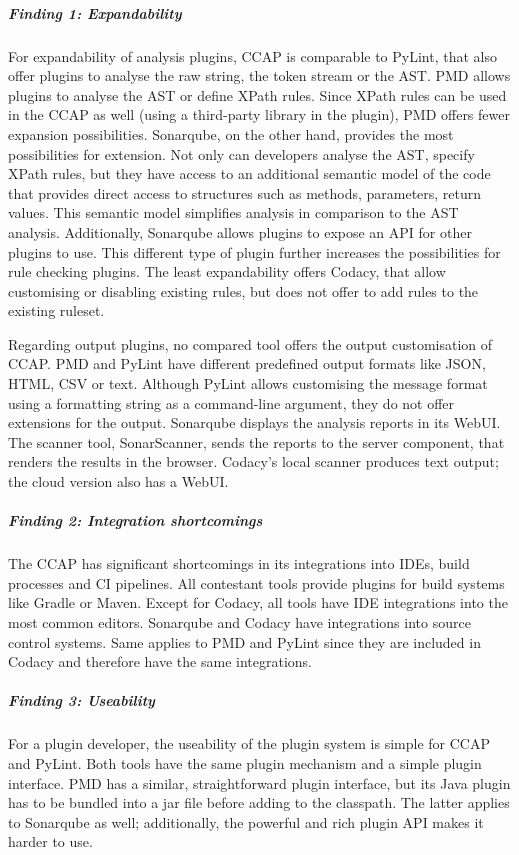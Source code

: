 \subparagraph{Finding 1: Expandability}
For expandability of analysis plugins, CCAP is comparable to PyLint, that also offer plugins to analyse the raw string, the token stream or the AST. PMD allows plugins to analyse the AST or define XPath rules. Since XPath rules can be used in the CCAP as well (using a third-party library in the plugin), PMD offers fewer expansion possibilities. Sonarqube, on the other hand, provides the most possibilities for extension. Not only can developers analyse the AST, specify XPath rules, but they have access to an additional semantic model of the code that provides direct access to structures such as methods, parameters, return values. This semantic model simplifies analysis in comparison to the AST analysis.
Additionally, Sonarqube allows plugins to expose an API for other plugins to use. This different type of plugin further increases the possibilities for rule checking plugins. The least expandability offers Codacy, that allow customising or disabling existing rules, but does not offer to add rules to the existing ruleset.

Regarding output plugins, no compared tool offers the output customisation of CCAP. PMD and PyLint have different predefined output formats like JSON, HTML, CSV or text. Although PyLint allows customising the message format using a formatting string as a command-line argument, they do not offer extensions for the output. Sonarqube displays the analysis reports in its WebUI. The scanner tool, SonarScanner, sends the reports to the server component, that renders the results in the browser. Codacy's local scanner produces text output; the cloud version also has a WebUI.

\subparagraph{Finding 2: Integration shortcomings}
The CCAP has significant shortcomings in its integrations into IDEs, build processes and CI pipelines. All contestant tools provide plugins for build systems like Gradle or Maven. Except for Codacy, all tools have IDE integrations into the most common editors. Sonarqube and Codacy have integrations into source control systems. Same applies to PMD and PyLint since they are included in Codacy and therefore have the same integrations.

\subparagraph{Finding 3: Useability}
For a plugin developer, the useability of the plugin system is simple for CCAP and PyLint. Both tools have the same plugin mechanism and a simple plugin interface. PMD has a similar, straightforward plugin interface, but its Java plugin has to be bundled into a jar file before adding to the classpath. The latter applies to Sonarqube as well; additionally, the powerful and rich plugin API makes it harder to use.

